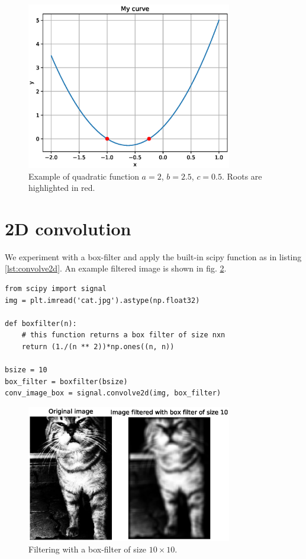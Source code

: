 \documentclass[12pt]{article}
\begin{document}
\begin{figure}
\centering
\includegraphics[width=0.8\textwidth]{pics/q1}
\caption{Example of quadratic function $a=2$, $b=2.5$, $c=0.5$. Roots are highlighted in red.}
\label{fig:q1}
\end{figure}

\section{2D convolution}
We experiment with a box-filter and apply the built-in scipy function as in listing \ref{lst:convolve2d}. An example filtered image is shown in fig. \ref{fig:boxfilter}.

\begin{lstlisting}[style=Python,
  caption={My 2D convolution approach.},
  label={lst:convolve2d}]
from scipy import signal
img = plt.imread('cat.jpg').astype(np.float32)

def boxfilter(n):
    # this function returns a box filter of size nxn
    return (1./(n ** 2))*np.ones((n, n))

bsize = 10
box_filter = boxfilter(bsize)
conv_image_box = signal.convolve2d(img, box_filter)
\end{lstlisting}

\begin{figure}
\centering
\includegraphics[width=0.8\textwidth]{pics/q2}
\caption{Filtering with a box-filter of size $10 \times 10$.}
\label{fig:boxfilter}
\end{figure}
\end{document}
